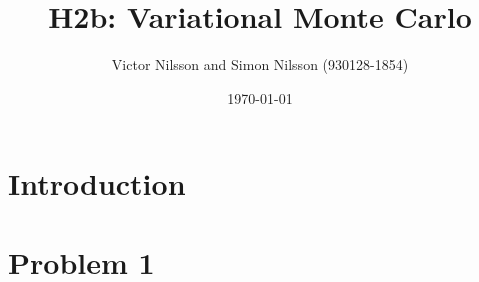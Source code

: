 



\title{H2b: Variational Monte Carlo}
\author{Victor Nilsson and Simon Nilsson (930128-1854)}
\date{\today}





\section*{Introduction}



\section*{Problem 1}

